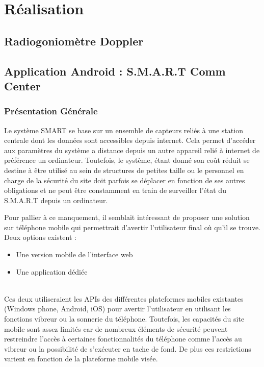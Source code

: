 \chapter{Réalisation}

\section{Radiogoniomètre Doppler}

\section{Application Android : S.M.A.R.T Comm Center}

\subsection{Présentation Générale}

	Le système SMART se base sur un ensemble de capteurs reliés à une station centrale dont les données sont accessibles depuis internet. Cela permet d'accéder aux paramètres du système a distance depuis un autre appareil relié à internet de préférence un ordinateur. Toutefois, le système, étant donné son coût réduit se destine à être utilisé au sein de structures de petites taille ou le personnel en charge de la sécurité du site doit parfois se déplacer en fonction de ses autres obligations et ne peut être constamment en train de surveiller l'état du S.M.A.R.T depuis un ordinateur. 
	
	Pour pallier à ce manquement, il semblait intéressant de proposer une solution sur téléphone mobile qui permettrait d'avertir l'utilisateur final où qu'il se trouve. Deux options existent :
	~\\
	\begin{itemize}
	
	\item Une version mobile de l'interface web
	\item Une application dédiée	
		
	\end{itemize}
	~\\
	 Ces deux utiliseraient les APIs des différentes plateformes mobiles existantes (Windows phone, Android, iOS) pour avertir l'utilisateur en utilisant les fonctions vibreur ou la sonnerie du téléphone.
	 Toutefois, les capacités du site mobile sont assez limités car de nombreux éléments de sécurité peuvent restreindre l'accès à certaines fonctionnalités du téléphone comme l'accès au vibreur ou la possibilité de s'exécuter en tache de fond. De plus ces restrictions varient en fonction de la plateforme mobile visée.
	

